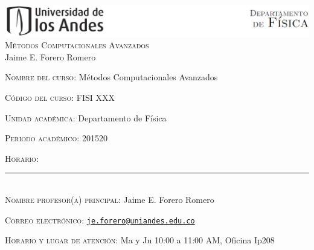 \documentclass[letterpaper,10pt,onecolumn]{article}
\begin{document}
\begin{center}

\includegraphics[width=490pt]{header.png}\\[0.5cm]

\textsc{\LARGE M\'etodos Computacionales Avanzados}\\[0.1cm]

\large Jaime E. Forero Romero\\[0.5cm]

\end{center}

\large \noindent\textsc{Nombre del curso:}  M\'etodos Computacionales Avanzados%
  
\noindent\textsc{C\'odigo del curso:} FISI XXX %

\noindent\textsc{Unidad acad\'emica:} Departamento de F\'isica

\noindent\textsc{Periodo acad\'emico:} 201520 %

\noindent\textsc{Horario:} %

\noindent\rule{\textwidth}{1pt}\\[-0.3cm]

\normalsize \noindent\textsc{Nombre profesor(a) principal:} Jaime
E. Forero Romero%

\noindent\textsc{Correo electr\'onico:}
\href{mailto:je.forero@uniandes.edu.co}{\nolinkurl{je.forero@uniandes.edu.co}}

\noindent\textsc{Horario y lugar de atenci\'on:} Ma y Ju 10:00 a
11:00 AM, Oficina Ip208 %


\end{document}

